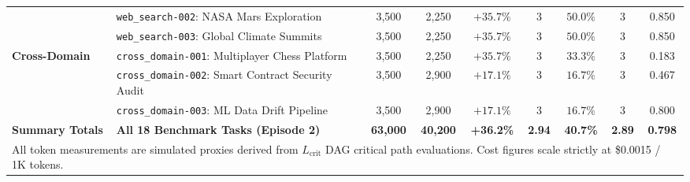 \begin{table}[t]
\begin{tabular}{l l c c c c c c c}
 & \texttt{web\_search-002}: NASA Mars Exploration & 3,500 & 2,250 & $+35.7\%$ & 3 & $50.0\%$ & 3 & 0.850 \\
 & \texttt{web\_search-003}: Global Climate Summits & 3,500 & 2,250 & $+35.7\%$ & 3 & $50.0\%$ & 3 & 0.850 \\
\textbf{Cross-Domain} & \texttt{cross\_domain-001}: Multiplayer Chess Platform & 3,500 & 2,250 & $+35.7\%$ & 3 & $33.3\%$ & 3 & 0.183 \\
 & \texttt{cross\_domain-002}: Smart Contract Security Audit & 3,500 & 2,900 & $+17.1\%$ & 3 & $16.7\%$ & 3 & 0.467 \\
 & \texttt{cross\_domain-003}: ML Data Drift Pipeline & 3,500 & 2,900 & $+17.1\%$ & 3 & $16.7\%$ & 3 & 0.800 \\
\midrule
\textbf{Summary Totals} & \textbf{All 18 Benchmark Tasks (Episode 2)} & \textbf{63,000} & \textbf{40,200} & \textbf{+36.2\%} & \textbf{2.94} & \textbf{40.7\%} & \textbf{2.89} & \textbf{0.798} \\
\bottomrule
\multicolumn{9}{l}{\footnotesize All token measurements are simulated proxies derived from $L_{\text{crit}}$ DAG critical path evaluations. Cost figures scale strictly at \$0.0015 / 1K tokens.} \\
\end{tabular}
\end{table}

